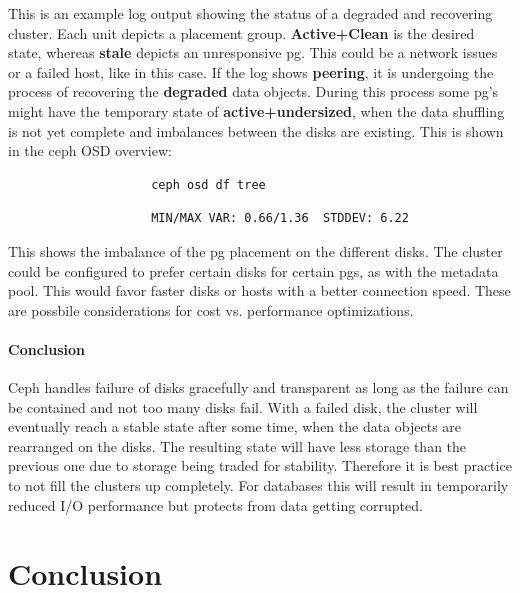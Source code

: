 \documentclass[titlepage, a4paper, 11pt]{scrartcl}
\begin{document}
                This is an example log output showing the status of a degraded and recovering cluster.
                Each unit depicts a placement group. \textbf{Active+Clean} is the desired state, whereas \textbf{stale} depicts an unresponsive pg. This could be a network issues or a failed host, like in this case. If the log shows \textbf{peering}, it is undergoing the process of recovering the \textbf{degraded} data objects. During this process some pg's might have the temporary state of \textbf{active+undersized}, when the data shuffling is not yet complete and imbalances between the disks are existing. This is shown in the ceph OSD overview:

                \begin{lstlisting}
                    ceph osd df tree
                \end{lstlisting}


                \begin{lstlisting}
                    MIN/MAX VAR: 0.66/1.36  STDDEV: 6.22
                \end{lstlisting}

                This shows the imbalance of the pg placement on the different disks. The cluster could be configured to prefer certain disks for certain pgs, as with the metadata pool. This would favor faster disks or hosts with a better connection speed. These are possbile considerations for cost vs. performance optimizations.

                \paragraph{Conclusion} Ceph handles failure of disks gracefully and transparent as long as the failure can be contained and not too many disks fail. With a failed disk, the cluster will eventually reach a stable state after some time, when the data objects are rearranged on the disks. The resulting state will have less storage than the previous one due to storage being traded for stability. Therefore it is best practice to not fill the clusters up completely. For databases this will result in temporarily reduced I/O performance but protects from data getting corrupted.

    \section{Conclusion}\label{conclusion}
\end{document}
